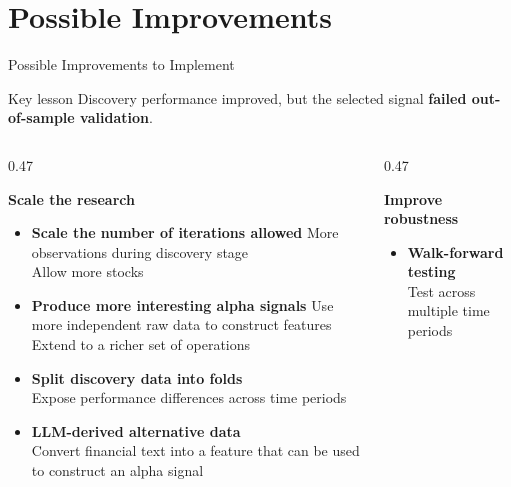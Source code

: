 \documentclass[10pt,aspectratio=169]{beamer}
\begin{document}
\section{Possible Improvements}
\begin{frame}{Possible Improvements to Implement}

\small

\begin{block}{Key lesson}
Discovery performance improved, but the selected signal
\textbf{failed out-of-sample validation}.
\end{block}

\vspace{0.10cm}

\begin{columns}[T,onlytextwidth]

\begin{column}{0.47\textwidth}

\textbf{Scale the research}

\begin{itemize}
	\item \textbf{Scale the number of iterations allowed}
	{\scriptsize More observations during discovery stage}\\
	{\scriptsize Allow more stocks}
	\item \textbf{Produce more interesting alpha signals}
	{\scriptsize Use more independent raw data to construct features}\\
	{\scriptsize Extend to a richer set of operations}
	\item \textbf{Split discovery data into folds}\\
	{\scriptsize Expose performance differences across time periods}
	\item \textbf{LLM-derived alternative data}\\
	{\scriptsize Convert financial text into a feature that can be used to construct an alpha signal}
\end{itemize}

\end{column}

\begin{column}{0.47\textwidth}

\textbf{Improve robustness}

\begin{itemize}
    \item \textbf{Walk-forward testing}\\
    {\scriptsize Test across multiple time periods}


\end{itemize}
\end{column}
\end{columns}
\end{frame}
\end{document}
